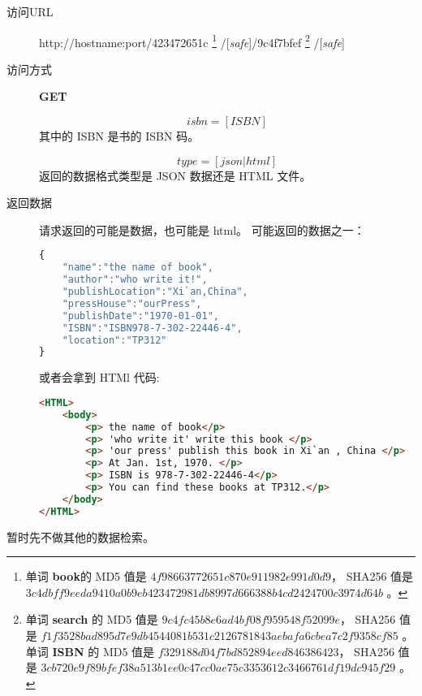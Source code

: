 \documentclass[UTF8]{article}
\def\safe{/[\textit{safe}]}
\def\GET{\colorbox[rgb]{0.77,0.53,0.97}{\textbf{GET}}}
\def\viaurl{\item[{\quad\colorbox[rgb]{0.47,0.88,0.89}{访问URL}}]}
\def\viareq#1{\item[{\quad\colorbox[rgb]{0.57,0.88,0.99}{访问方式}}] #1}
\def\rtdata{\item[{\quad\colorbox[rgb]{0.70,0.9,0.59}{返回数据}}]}
\begin{document}
                \begin{description}
                    
                    \viaurl http://hostname:port/423472651c
                    \footnote{单词 \textbf{book}的
                        MD5 值是 $4f98663772651c870e911982e991d0d9$，
                        SHA256 值是
                        $3c4dbff9eeda9410a0b9eb423472981db8997d666388b4cd2424700c3974d64b$
                        。
                    }
                    \safe/9c4f7bfef
                    \footnote{
                        单词 \textbf{search} 的
                        MD5 值是 $9c4fc45b8e6ad4bf08f959548f52099e$，
                        SHA256 值是
                        $f1f3528bad895d7e9db4544081b531c2126781843aebafa6cbea7c2f9358cf85$
                        。
                        单词 \textbf{ISBN} 的
                        MD5 值是 $f329188d04f7bd852894eed846386423$，
                        SHA256 值是
                        $3cb720e9f89bfef38a513b1ee0c47cc0ae75c3353612c3466761df19dc945f29$
                        。
                    }
                    \safe
                    
                    
                    \viareq \GET
                    
                    
                    $$isbn=[ISBN]$$
                    其中的 ISBN 是书的 ISBN 码。
                    
                    
                    $$type=[json|html]$$
                    返回的数据格式类型是 JSON 数据还是 HTML 文件。
                    
                    \rtdata 请求返回的可能是数据，也可能是 html。
                    可能返回的数据之一：
                    \begin{lstlisting}[language=JavaScript]
{
    "name":"the name of book",
    "author":"who write it!",
    "publishLocation":"Xi`an,China",
    "pressHouse":"ourPress",
    "publishDate":"1970-01-01",
    "ISBN":"ISBN978-7-302-22446-4",
    "location":"TP312"
}
                    \end{lstlisting}
                    或者会拿到 HTMl 代码:
                    \begin{lstlisting}[language=HTML]
<HTML>
    <body>
        <p> the name of book</p>
        <p> 'who write it' write this book </p>
        <p> 'our press' publish this book in Xi`an , China </p>
        <p> At Jan. 1st, 1970. </p>
        <p> ISBN is 978-7-302-22446-4</p>
        <p> You can find these books at TP312.</p>
    </body>
</HTML>
                    \end{lstlisting}
                \end{description}
        暂时先不做其他的数据检索。
\end{document}

